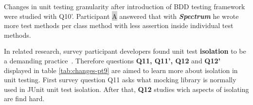     \begin{table}[H]
             \caption {Unit testing practices and changes in them} \label{tab:changes-pt8}
     \end{table}

Changes in unit testing granularity after introduction of BDD testing framework were studied with Q10'. Participant {\colorbox{lightgray}A}
answered that with \textbf{\textit{Spectrum}} he wrote more test methods per class method with less assertion inside individual
test methods.

\clearpage

In related research, survey participant developers found unit test \textbf{isolation} to be a demanding practice~\cite{daka2014survey}.
Therefore questions \textbf{Q11, Q11', Q12} and \textbf{Q12'} displayed in table \ref{tab:changes-pt9} are aimed to learn more about isolation in unit testing.
First survey question Q11 asks what mocking library is normally used in JUnit unit test isolation. After that,
\textbf{Q12} studies wich aspects of isolating are find hard.

